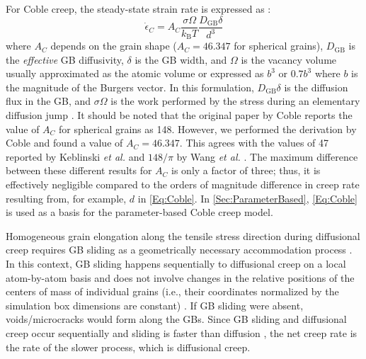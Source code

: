 \documentclass[preprint,12pt,sort&compress]{elsarticle}
\newcommand{\?}{\stackrel{?}{=}}
\begin{document}

For Coble creep, the steady-state strain rate is expressed as \cite{Coble1963, Courtney2005}:
\begin{equation}
\Dot{\epsilon}_C = A_C \frac{\sigma \Omega}{k_\mathrm{B} T} \frac{ D_{\mathrm{GB}} \delta }{d^3} 
\label{Eq:Coble}
\end{equation}
where $A_C$ depends on the grain shape ($A_C = 46.347$ for spherical grains), $D_{\mathrm{GB}}$ is the \textit{effective} GB diffusivity, $\delta$ is the GB width, and $\Omega$ is the vacancy volume usually approximated as the atomic volume or expressed as $b^3$ \cite{Mukherjee2002} or $0.7b^3$ \cite{Meyers2009} where $b$ is the magnitude of the Burgers vector. In this formulation, $D_{\mathrm{GB}} \delta$ is the diffusion flux in the GB, and $\sigma \Omega$ is the work performed by the stress during an elementary diffusion jump \cite{Keblinski1998, Yamakov2002}. It should be noted that the original paper by Coble \cite{Coble1963} reports the value of $A_C$ for spherical grains as 148. However, we performed the derivation by Coble and found a value of $A_C = 46.347$. This agrees with the values of 47 reported by Keblinski \textit{et al.} \cite{Keblinski1998} and $148/\pi$ by Wang \textit{et al.} \cite{Wang2011}. The maximum difference between these different results for $A_C$ is only a factor of three; thus, it is effectively negligible compared to the orders of magnitude difference in creep rate resulting from, for example, $d$ in \cref{Eq:Coble}. In \cref{Sec:ParameterBased}, \cref{Eq:Coble} is used as a basis for the parameter-based Coble creep model.

Homogeneous grain elongation along the tensile stress direction during diffusional creep requires GB sliding as a geometrically necessary accommodation process \cite{Yamakov2002, Courtney2005}. In this context, GB sliding happens sequentially to diffusional creep on a local atom-by-atom basis and does not involve changes in the relative positions of the centers of mass of individual grains (i.e., their coordinates normalized by the simulation box dimensions are constant) \cite{Courtney2005}. If GB sliding were absent, voids/microcracks would form along the GBs. Since GB sliding and diffusional creep occur sequentially and sliding is faster than diffusion \cite{Courtney2005}, the net creep rate is the rate of the slower process, which is diffusional creep.
\end{document}
